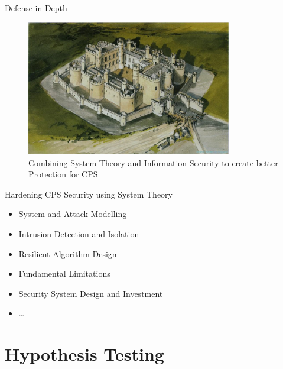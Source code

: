 \documentclass[10pt]{beamer}
\begin{document}
\begin{frame}{Defense in Depth}
  \begin{figure}[<+htpb+>]
    \begin{center}
      \includegraphics[width=0.8\textwidth]{defense_in_depth.jpg}
      \caption{Combining System Theory and Information Security to create better Protection for CPS}
    \end{center}
  \end{figure}
\end{frame}

\begin{frame}{Hardening CPS Security using System Theory}
  \begin{itemize}
  \item System and Attack Modelling
  \item Intrusion Detection and Isolation
  \item Resilient Algorithm Design
  \item Fundamental Limitations
  \item Security System Design and Investment
  \item \dots
  \end{itemize}
\end{frame}


\section{Hypothesis Testing}
\end{document}
